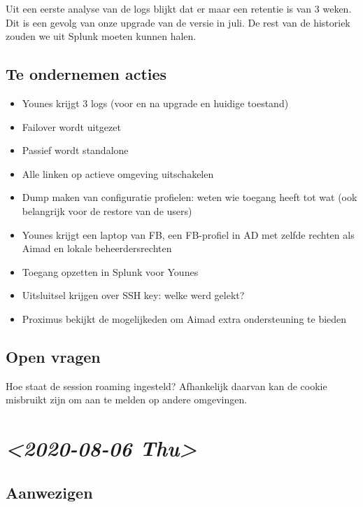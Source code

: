 \documentclass[11pt]{article}
\begin{document}
Uit een eerste analyse van de logs blijkt dat er maar een retentie is van 3 weken. Dit is een gevolg van onze upgrade van de versie in juli. De rest van de historiek zouden we uit Splunk moeten kunnen halen.

\subsection{Te ondernemen acties}
\label{sec:orgf11d060}
\begin{itemize}
\item Younes krijgt 3 logs (voor en na upgrade en huidige toestand)
\item Failover wordt uitgezet
\item Passief wordt standalone
\item Alle linken op actieve omgeving uitschakelen
\item Dump maken van configuratie profielen: weten wie toegang heeft tot wat (ook belangrijk voor de restore van de users)
\item Younes krijgt een laptop van FB, een FB-profiel in AD met zelfde rechten als Aimad en lokale beheerdersrechten
\item Toegang opzetten in Splunk voor Younes
\item Uitsluitsel krijgen over SSH key: welke werd gelekt?
\item Proximus bekijkt de mogelijkeden om Aimad extra ondersteuning te bieden
\end{itemize}

\subsection{Open vragen}
\label{sec:orgf2994f5}
Hoe staat de session roaming ingesteld? Afhankelijk daarvan kan de cookie misbruikt zijn om aan te melden op andere omgevingen.


\section{\textit{<2020-08-06 Thu>}}
\label{sec:orgd0dfd74}
\subsection{Aanwezigen}
\label{sec:orge425d38}
\end{document}

